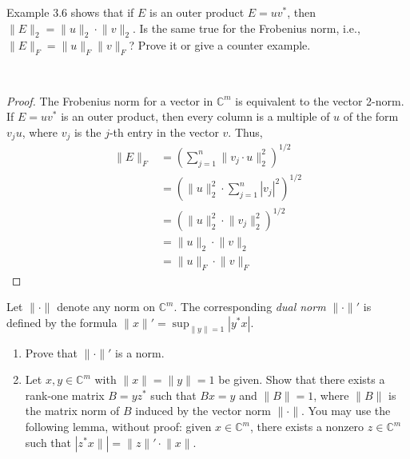 \documentclass[12pt]{article}
\newenvironment{ex}[2][Exercise]{\begin{trivlist}
		\item[\hskip \labelsep {\bfseries #1}\hskip \labelsep {\bfseries #2.}]}{\end{trivlist}}
\newenvironment{sol}[1][Solution]{\begin{trivlist}
		\item[\hskip \labelsep {\bfseries #1:}]}{\end{trivlist}}
\begin{document}
\begin{ex}{5}
	Example 3.6 shows that if $E$ is an outer product $E=uv^*$, then $\lVert E\rVert_2 = \lVert u\rVert_2\cdot
	\lVert v\rVert_2$. Is the same true for the Frobenius norm, i.e., $\lVert E\rVert_F = \lVert u\rVert_F
	\lVert v\rVert_F$? Prove it or give a counter example.
\end{ex}

\begin{sol}
	\
	\begin{proof}
		The Frobenius norm for a vector in $\mathbb{C}^m$ is equivalent to the vector 2-norm. If
		$E=uv^*$ is an outer product, then every column is a multiple of $u$ of the form $v_ju$, where
		$v_j$ is the $j$-th entry in the vector $v$. Thus,
		\begin{align*}
			\lVert E\rVert_F &= \left(\sum_{j=1}^{n}\lVert v_j\cdot u\rVert_2^2\right)^{1/2}\\
			&=\left(\lVert u\rVert_2^2\cdot \sum_{j=1}^{n}|v_j|^2\right)^{1/2}\\
			&=\left(\lVert u\rVert_2^2\cdot \lVert v_j\rVert_2^2\right)^{1/2}\\
			&=\lVert u\rVert_2\cdot \lVert v\rVert_2\\
			&=\lVert u\rVert_F\cdot \lVert v\rVert_F
		\end{align*}
	\end{proof}
\end{sol}

\begin{ex}{6}
	Let $\lVert\cdot \rVert$ denote any norm on $\mathbb{C}^m$. The corresponding \emph{dual norm}
	$\lVert \cdot\rVert'$ is defined by the formula $\lVert x\rVert'=\sup_{\lVert y\rVert=1}|y^*x|$.
	\begin{enumerate}[label=(\alph*)]
		\item Prove that $\lVert \cdot \rVert'$ is a norm.
		\item Let $x,y\in\mathbb{C}^m$ with $\lVert x\rVert = \lVert y\rVert =1$ be given. Show that there
		exists a rank-one matrix $B=yz^*$ such that $Bx=y$ and $\lVert B\rVert = 1$, where $\lVert B\rVert$
		is the matrix norm of $B$ induced by the vector norm $\lVert \cdot \rVert$. You may use the following
		lemma, without proof: given $x\in \mathbb{C}^m$, there exists a nonzero $z\in\mathbb{C}^m$ such
		that $|z^*x\rVert| = \lVert z\rVert'\cdot \lVert x\rVert$.
	\end{enumerate}
\end{ex}
\end{document}
